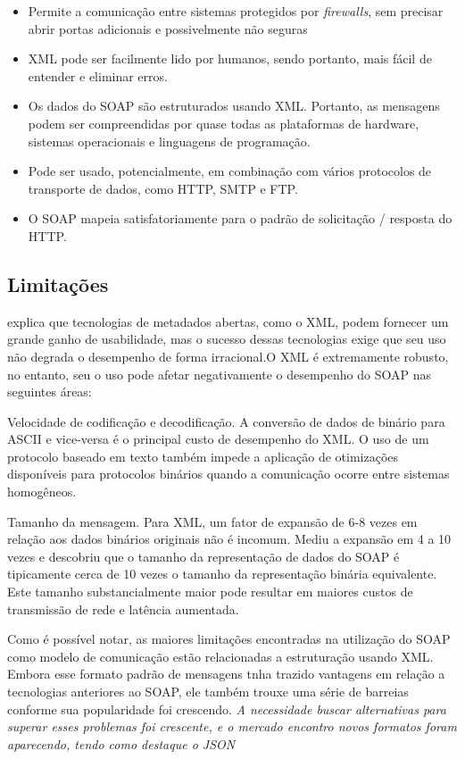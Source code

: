 \begin{itemize}
\item Permite a comunicação entre sistemas protegidos por \textit{firewalls}, sem precisar abrir portas adicionais e possivelmente não seguras
\item XML pode ser facilmente lido por humanos, sendo portanto, mais fácil de entender e eliminar erros.
\item Os dados do SOAP são estruturados usando XML. Portanto, as mensagens podem ser compreendidas por quase todas as plataformas de hardware, sistemas operacionais e linguagens de programação.
\item Pode ser usado, potencialmente, em combinação com vários protocolos de transporte de dados, como HTTP, SMTP e FTP.
\item O SOAP mapeia satisfatoriamente para o padrão de solicitação / resposta do HTTP.
\end{itemize}

\subsection{Limitações}

 explica que tecnologias de metadados abertas, como o XML, podem fornecer um grande ganho de usabilidade, mas o sucesso dessas tecnologias exige que seu uso não degrada o desempenho de forma irracional.O XML é extremamente robusto, no entanto, seu o uso pode afetar negativamente o desempenho do SOAP nas seguintes áreas:

Velocidade de codificação e decodificação. A conversão de dados de binário para ASCII e vice-versa é o principal custo de desempenho do XML. O uso de um protocolo baseado em texto também impede a aplicação de otimizações disponíveis para protocolos binários quando a comunicação ocorre entre sistemas homogêneos.

Tamanho da mensagem. Para XML, um fator de expansão de 6-8 vezes em relação aos dados binários originais não é incomum. Mediu a expansão em 4 a 10 vezes e descobriu que o tamanho da representação de dados do SOAP é tipicamente cerca de 10 vezes o tamanho da representação binária equivalente. Este tamanho substancialmente maior pode resultar em maiores custos de transmissão de rede e latência aumentada.

Como é possível notar, as maiores limitações encontradas na utilização do SOAP como modelo de comunicação estão relacionadas a estruturação usando XML. Embora esse formato padrão de mensagens tnha trazido vantagens em relação a tecnologias anteriores ao SOAP, ele também trouxe uma série de barreias conforme sua popularidade foi crescendo. \textit{A necessidade buscar alternativas para superar esses problemas  foi crescente, e o mercado encontro novos formatos foram aparecendo, tendo como destaque o JSON}

